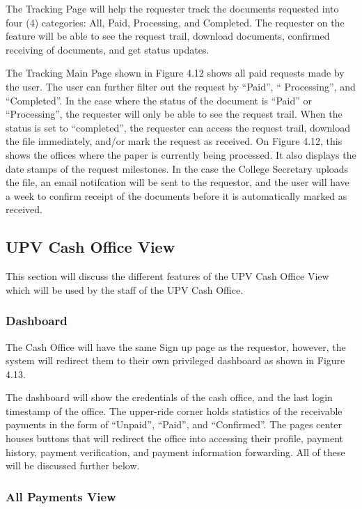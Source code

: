 The Tracking Page will help the requester track the documents requested into four (4) categories: All, Paid, Processing, and Completed.  The requester on the feature will be able to see the request trail, download documents, confirmed receiving of documents, and get status updates.

The Tracking Main Page shown in Figure 4.12 shows all paid requests made by the user. The user can further filter out the request by “Paid”, “ Processing”, and “Completed”. In the case where the status of the document is “Paid” or “Processing”, the requester will only be able to see the request trail. When the status is set to “completed”, the requester can access the request trail, download the file immediately, and/or mark the request as received. On Figure 4.12, this shows the offices where the paper is currently being processed. It also displays the date stamps of the request milestones. In the case the College Secretary uploads the file, an email notifcation will be sent to the requestor, and the user will have a week to confirm receipt of the documents before it is automatically marked as received.

\subsection{UPV Cash Office View}

This section will discuss the different features of the UPV Cash Office View which will be used by the staff of the UPV Cash Office.

\subsubsection{Dashboard}

The Cash Office will have the same Sign up page as the requestor, however, the system will redirect them to their own privileged dashboard as shown in Figure 4.13.

The dashboard will show the credentials of the cash office, and the last login timestamp of the office. The upper-ride corner holds statistics of the receivable payments in the form of “Unpaid”, “Paid”, and “Confirmed”. The page\textsc{}s center houses buttons that will redirect the office into accessing their profile, payment history, payment verification, and payment information forwarding. All of these will be discussed further below.

\subsubsection{All Payments View}

